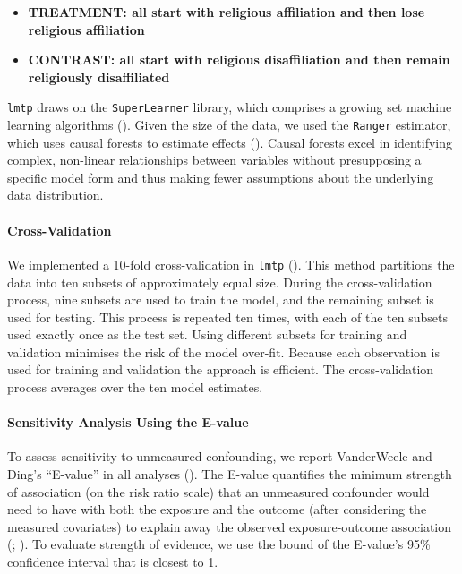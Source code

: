 \documentclass[
  singlecolumn]{article}
\let\oldparagraph\paragraph
\renewcommand{\paragraph}[1]{\oldparagraph{#1}\mbox{}}
\begin{document}
\begin{itemize}
\item
  \textbf{TREATMENT: all start with religious affiliation and then lose
  religious affiliation}
\item
  \textbf{CONTRAST: all start with religious disaffiliation and then
  remain religiously disaffiliated}
\end{itemize}

\texttt{lmtp} draws on the \texttt{SuperLearner} library, which
comprises a growing set machine learning algorithms
(). Given the
size of the data, we used the \texttt{Ranger} estimator, which uses
causal forests to estimate effects (). Causal forests excel in identifying complex, non-linear
relationships between variables without presupposing a specific model
form and thus making fewer assumptions about the underlying data
distribution.

\paragraph{Cross-Validation}\label{cross-validation}

We implemented a 10-fold cross-validation in \texttt{lmtp}
(). This method
partitions the data into ten subsets of approximately equal size. During
the cross-validation process, nine subsets are used to train the model,
and the remaining subset is used for testing. This process is repeated
ten times, with each of the ten subsets used exactly once as the test
set. Using different subsets for training and validation minimises the
risk of the model over-fit. Because each observation is used for
training and validation the approach is efficient. The cross-validation
process averages over the ten model estimates.

\paragraph{Sensitivity Analysis Using the
E-value}\label{sensitivity-analysis-using-the-e-value}

To assess sensitivity to unmeasured confounding, we report VanderWeele
and Ding's ``E-value'' in all analyses
(). The E-value
quantifies the minimum strength of association (on the risk ratio scale)
that an unmeasured confounder would need to have with both the exposure
and the outcome (after considering the measured covariates) to explain
away the observed exposure-outcome association
(;
). To
evaluate strength of evidence, we use the bound of the E-value's 95\%
confidence interval that is closest to 1.
\end{document}
